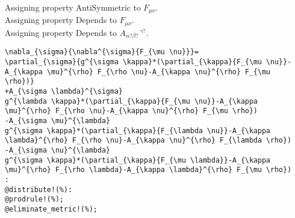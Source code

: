 \documentclass[11pt]{article}
\begin{document}
Assigning property AntiSymmetric to ${F}_{\mu \nu}$.
\\
Assigning property Depends to ${F}_{\mu \nu}$.
\\
Assigning property Depends to ${A}_{\alpha? \beta?}\,^{\gamma?}$.
\\
{\color[named]{Blue}\begin{verbatim}
\nabla_{\sigma}{\nabla^{\sigma}{F_{\mu \nu}}}=
\partial_{\sigma}{g^{\sigma \kappa}*(\partial_{\kappa}{F_{\mu \nu}}-A_{\kappa \mu}^{\rho} F_{\rho \nu}-A_{\kappa \nu}^{\rho} F_{\mu \rho})}
+A_{\sigma \lambda}^{\sigma}
g^{\lambda \kappa}*(\partial_{\kappa}{F_{\mu \nu}}-A_{\kappa \mu}^{\rho} F_{\rho \nu}-A_{\kappa \nu}^{\rho} F_{\mu \rho})
-A_{\sigma \mu}^{\lambda}
g^{\sigma \kappa}*(\partial_{\kappa}{F_{\lambda \nu}}-A_{\kappa \lambda}^{\rho} F_{\rho \nu}-A_{\kappa \nu}^{\rho} F_{\lambda \rho})
-A_{\sigma \nu}^{\lambda}
g^{\sigma \kappa}*(\partial_{\kappa}{F_{\mu \lambda}}-A_{\kappa \mu}^{\rho} F_{\rho \lambda}-A_{\kappa \lambda}^{\rho} F_{\mu \rho})
:
@distribute!(%):
@prodrule!(%);
@eliminate_metric!(%);
\end{verbatim}}
\end{document}
